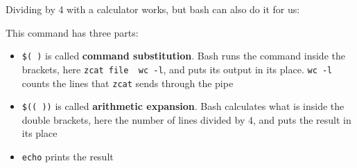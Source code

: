 \documentclass[
  letterpaper,
  DIV=11,
  numbers=noendperiod]{scrreprt}
\newenvironment{Shaded}{}{}
\newcommand{\AttributeTok}[1]{\textcolor[rgb]{0.84,0.23,0.29}{#1}}
\newcommand{\BuiltInTok}[1]{\textcolor[rgb]{0.84,0.23,0.29}{#1}}
\newcommand{\DecValTok}[1]{\textcolor[rgb]{0.00,0.36,0.77}{#1}}
\newcommand{\FunctionTok}[1]{\textcolor[rgb]{0.44,0.26,0.76}{#1}}
\newcommand{\KeywordTok}[1]{\textcolor[rgb]{0.84,0.23,0.29}{#1}}
\newcommand{\NormalTok}[1]{\textcolor[rgb]{0.14,0.16,0.18}{#1}}
\newcommand{\OperatorTok}[1]{\textcolor[rgb]{0.14,0.16,0.18}{#1}}
\newcommand{\VariableTok}[1]{\textcolor[rgb]{0.89,0.38,0.04}{#1}}
\providecommand{\tightlist}{%
  \setlength{\itemsep}{0pt}\setlength{\parskip}{0pt}}
\begin{document}
\begin{tcolorbox}[enhanced jigsaw, coltitle=black, breakable, titlerule=0mm, colback=white, rightrule=.15mm, bottomrule=.15mm, toprule=.15mm, colframe=quarto-callout-tip-color-frame, colbacktitle=quarto-callout-tip-color!10!white, bottomtitle=1mm, opacitybacktitle=0.6, toptitle=1mm, leftrule=.75mm, arc=.35mm, title=\textcolor{quarto-callout-tip-color}{\faLightbulb}\hspace{0.5em}{Tip: Better counting (optional)}, left=2mm, opacityback=0]

Dividing by 4 with a calculator works, but bash can also do it for us:

\begin{Shaded}
\end{Shaded}

This command has three parts:

\begin{itemize}
\tightlist
\item
  \texttt{\$(\ )} is called \textbf{command substitution}. Bash runs the
  command inside the brackets, here
  \texttt{zcat\ file\ \textbar{}\ wc\ -l}, and puts its output in its
  place. \texttt{wc\ -l} counts the lines that \texttt{zcat} sends
  through the pipe
\item
  \texttt{\$((\ ))} is called \textbf{arithmetic expansion}. Bash
  calculates what is inside the double brackets, here the number of
  lines divided by 4, and puts the result in its place
\item
  \texttt{echo} prints the result
\end{itemize}

\end{tcolorbox}
\end{document}
